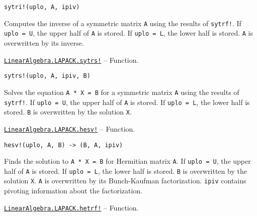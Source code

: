 \begin{adjustwidth}{2em}{0pt}


\begin{verbatim}
sytri!(uplo, A, ipiv)
\end{verbatim}

Computes the inverse of a symmetric matrix \texttt{A} using the results of \texttt{sytrf!}. If \texttt{uplo = U}, the upper half of \texttt{A} is stored. If \texttt{uplo = L}, the lower half is stored. \texttt{A} is overwritten by its inverse.



\end{adjustwidth}
\hypertarget{1871905390771924166}{}
\hyperlink{1871905390771924166}{\texttt{LinearAlgebra.LAPACK.sytrs!}}  -- {Function.}

\begin{adjustwidth}{2em}{0pt}


\begin{verbatim}
sytrs!(uplo, A, ipiv, B)
\end{verbatim}

Solves the equation \texttt{A * X = B} for a symmetric matrix \texttt{A} using the results of \texttt{sytrf!}. If \texttt{uplo = U}, the upper half of \texttt{A} is stored. If \texttt{uplo = L}, the lower half is stored. \texttt{B} is overwritten by the solution \texttt{X}.



\end{adjustwidth}
\hypertarget{4935444719459229500}{}
\hyperlink{4935444719459229500}{\texttt{LinearAlgebra.LAPACK.hesv!}}  -- {Function.}

\begin{adjustwidth}{2em}{0pt}


\begin{verbatim}
hesv!(uplo, A, B) -> (B, A, ipiv)
\end{verbatim}

Finds the solution to \texttt{A * X = B} for Hermitian matrix \texttt{A}. If \texttt{uplo = U}, the upper half of \texttt{A} is stored. If \texttt{uplo = L}, the lower half is stored. \texttt{B} is overwritten by the solution \texttt{X}. \texttt{A} is overwritten by its Bunch-Kaufman factorization. \texttt{ipiv} contains pivoting information about the factorization.



\end{adjustwidth}
\hypertarget{13823783742790511702}{}
\hyperlink{13823783742790511702}{\texttt{LinearAlgebra.LAPACK.hetrf!}}  -- {Function.}

